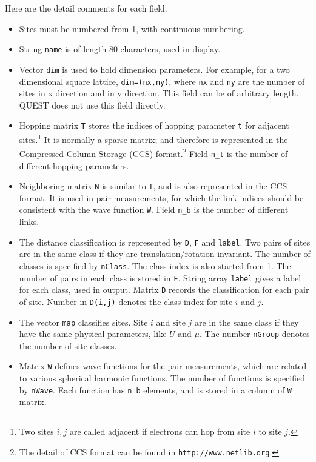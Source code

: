 \documentclass[12pt]{article}
\begin{document}
Here are the detail comments for each field.
\begin{itemize}
 \item Sites must be numbered from 1, with continuous numbering.
 \item String \verb"name" is of length 80 characters, used in display.
 \item Vector \verb"dim" is used to hold dimension parameters. For example, for a two dimensional square lattice, \verb"dim=(nx,ny)", where \verb"nx" and \verb"ny" are the number of sites in x direction and in y direction. This field can be of arbitrary length. QUEST does not use this field directly.
 \item Hopping matrix \verb|T| stores the indices of hopping parameter \verb"t" for adjacent sites.\footnote{Two sites $i,j$ are called adjacent if electrons can hop from site $i$ to site $j$.} It is normally a sparse matrix; and therefore is represented in the Compressed Column Storage (CCS) format.\footnote{The detail of CCS format can be found in {\tt http://www.netlib.org}.} Field \verb"n_t" is the number of different hopping parameters.
 \item Neighboring matrix \verb|N| is similar to \verb|T|, and is also represented in the CCS format. It is used in pair measurements, for which the link indices should be consistent with the wave function \verb"W". Field \verb"n_b" is the number of different links.
 \item The distance classification is represented by \verb|D|, \verb|F| and \verb|label|. Two pairs of sites are in the same class if they are translation/rotation invariant.
     The number of classes is specified by \verb|nClass|. The class index is also started from 1. The number of pairs in each class is stored in \verb|F|.
     String array \verb|label| gives a label for each class, used in output.
     Matrix \verb|D| records the classification for each pair of site.
     Number in \verb|D(i,j)| denotes the class index for site $i$ and $j$.
 \item The vector \verb"map" classifies sites. Site $i$ and site $j$ are in the same class if they have the same physical parameters, like $U$ and $\mu$. The number \verb"nGroup" denotes the number of site classes.
 \item Matrix \verb|W| defines wave functions for the pair measurements, which are related to various spherical harmonic functions. The number of functions is specified by \verb|nWave|. Each function has \verb|n_b| elements, and is stored in a column of \verb|W| matrix.

\end{itemize}
\end{document}
